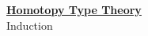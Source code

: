 \documentclass[hott-all.tex]{subfiles}
\begin{document}
\begin{center}
  {\Large{\underline{\textbf{Homotopy Type Theory}}}} \\[2mm]
  {\large Induction}
\end{center}

\setcounter{chapter}{5}

% 
% 
% 
% 
\end{document}
